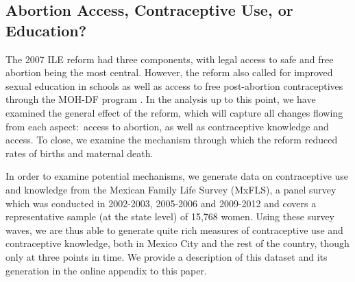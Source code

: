 \documentclass[a4paper, 11pt]{article}
\begin{document}
\begin{spacing}{2}

\subsection{Abortion Access, Contraceptive Use, or Education?}\label{Mechanisms}
The 2007 ILE reform had three components, with legal access to safe and free abortion being the most central. However, the reform also called for improved sexual education in schools as well as access to free post-abortion contraceptives through the MOH-DF program \citep{Becker2013}. In the analysis up to this point, we have examined the general effect of the reform, which will capture all changes flowing from each aspect:\ access to abortion, as well as contraceptive knowledge and access. To close, we examine the mechanism through which the reform reduced rates of births and maternal death.

In order to examine potential mechanisms, we generate data on contraceptive use and knowledge from the Mexican Family Life Survey (MxFLS), a panel survey which was conducted in 2002-2003, 2005-2006 and 2009-2012 and covers a representative sample (at the state level) of 15,768 women.  Using these survey waves, we are thus able to generate quite rich measures of contraceptive use and contraceptive knowledge, both in Mexico City and the rest of the country, though only at three points in time.  We provide a description of this dataset and its generation in the online appendix to this paper.


\end{spacing}
\end{document}
